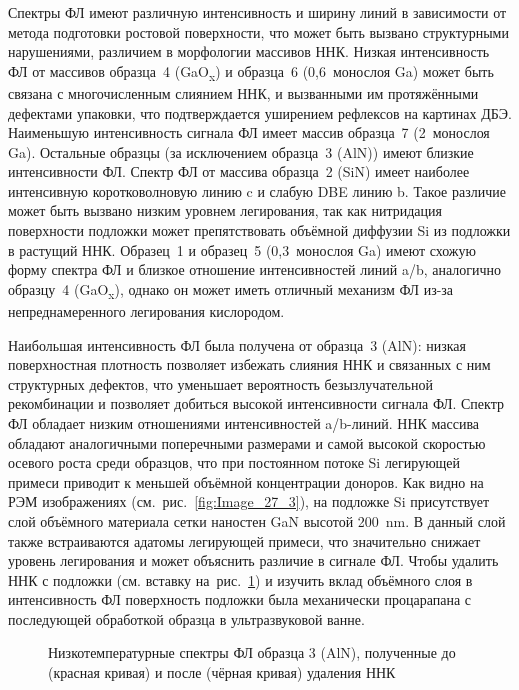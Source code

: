 Спектры ФЛ имеют различную интенсивность и ширину линий в зависимости от метода
подготовки ростовой поверхности, что может быть вызвано структурными
нарушениями, различием в морфологии массивов ННК. Низкая интенсивность ФЛ от
массивов образца~4 (GaO\textsubscript{x}) и образца~6 (0,6~монослоя Ga) может
быть связана с многочисленным слиянием ННК, и вызванными им протяжёнными
дефектами упаковки, что подтверждается уширением рефлексов на картинах ДБЭ.
Наименьшую интенсивность сигнала ФЛ имеет массив образца~7 (2~монослоя Ga).
Остальные образцы (за исключением образца~3 (AlN)) имеют близкие интенсивности
ФЛ. Спектр ФЛ от массива образца~2 (SiN) имеет наиболее интенсивную
коротковолновую линию c и слабую DBE линию b. Такое различие может быть вызвано
низким уровнем легирования, так как нитридация поверхности подложки может
препятствовать объёмной диффузии Si из подложки в растущий ННК. Образец~1 и
образец~5 (0,3~монослоя Ga) имеют схожую форму спектра ФЛ и близкое отношение
интенсивностей линий a/b, аналогично образцу~4 (GaO\textsubscript{x}), однако
он может иметь отличный механизм ФЛ из-за непреднамеренного легирования
кислородом.

Наибольшая интенсивность ФЛ была получена от образца~3 (AlN): низкая
поверхностная плотность позволяет избежать слияния ННК и связанных с ним
структурных дефектов, что уменьшает вероятность безызлучательной рекомбинации и
позволяет добиться высокой интенсивности сигнала ФЛ. Спектр ФЛ обладает низким
отношениями интенсивностей a/b-линий. ННК массива обладают аналогичными
поперечными размерами и самой высокой скоростью осевого роста среди образцов,
что при постоянном потоке Si легирующей примеси приводит к меньшей объёмной
концентрации доноров. Как видно на РЭМ изображениях
(см.~рис.~\cref{fig:Image_27_3}), на подложке Si присутствует слой объёмного
материала сетки наностен GaN высотой 200~\si{\nano\meter}. В данный слой также
встраиваются адатомы легирующей примеси, что значительно снижает уровень
легирования и может объяснить различие в сигнале ФЛ. Чтобы удалить ННК с
подложки (см. вставку на~рис.~\cref{fig:Image_30_2}) и изучить вклад объёмного
слоя в интенсивность ФЛ поверхность подложки была механически процарапана с
последующей обработкой образца в ультразвуковой ванне.

\begin{figure}[ht]   \caption{Низкотемпературные спектры ФЛ образца 3
		(AlN), полученные до (красная кривая) и после (чёрная кривая) удаления
ННК}\label{fig:Image_30_2} \end{figure}

